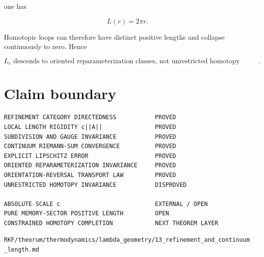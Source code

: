 one has

\[
L(r)=2\pi r.
\]

Homotopic loops can therefore have distinct positive lengths and collapse continuously to zero. Hence

\[
\boxed{L_c\text{ descends to oriented reparameterization classes, not unrestricted homotopy classes}.}
\]

\hypertarget{claim-boundary}{%
\section{Claim boundary}\label{claim-boundary}}

\begin{verbatim}
REFINEMENT CATEGORY DIRECTEDNESS           PROVED
LOCAL LENGTH RIGIDITY c||A||               PROVED
SUBDIVISION AND GAUGE INVARIANCE           PROVED
CONTINUUM RIEMANN-SUM CONVERGENCE          PROVED
EXPLICIT LIPSCHITZ ERROR                   PROVED
ORIENTED REPARAMETERIZATION INVARIANCE     PROVED
ORIENTATION-REVERSAL TRANSPORT LAW         PROVED
UNRESTRICTED HOMOTOPY INVARIANCE           DISPROVED

ABSOLUTE SCALE c                           EXTERNAL / OPEN
PURE MEMORY-SECTOR POSITIVE LENGTH         OPEN
CONSTRAINED HOMOTOPY COMPLETION            NEXT THEOREM LAYER
\end{verbatim}

\begin{flushright}\small\texttt{RKF/theorum/thermodynamics/lambda\_geometry/13\_refinement\_and\_continuum\_length.md}\end{flushright}
